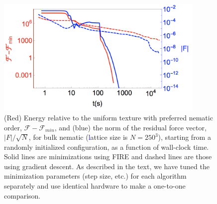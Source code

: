 \documentclass[utf8]{frontiersFPHY} %
\newcommand{\DAB}[1]{\textcolor{blue}{#1}}
\begin{document}
\begin{figure}[h!]
\begin{center}
\includegraphics[width=10cm]{Fig2MinimizationTiming.jpg}
\end{center}
\caption{ (Red) Energy relative to the uniform texture with preferred nematic order, $\mathcal{F}-\mathcal{F}_{min}$, and (blue) the norm of the residual force vector, $|F|/\sqrt{N}$, for bulk nematic (\DAB{l}attice size is $N=250^3$), starting from a randomly initialized configuration, as a function of wall-clock time. Solid lines are minimizations using FIRE  and dashed lines are those using gradient descent. As described in the text, we have tuned the minimization parameters (step size, etc.) for each algorithm separately and use identical hardware to make a one-to-one comparison.}\label{fig:minimizationTiming}
\end{figure}
\end{document}
